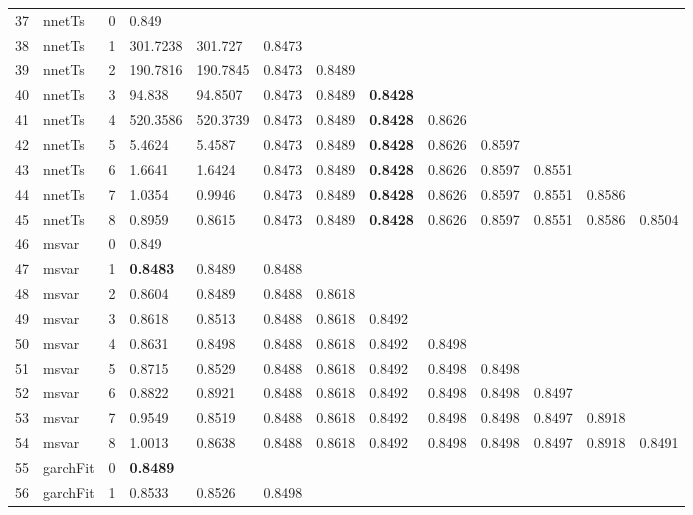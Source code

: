 \documentclass[10pt,a4paper]{article}
\begin{document}
\begin{table}[ht]
\begin{tabular}{rlrllllllllll}
   \hline
37 & nnetTs &     0 & 0.849 &  &  &  &  &  &  &  &  &  \\ 
  38 & nnetTs &     1 & 301.7238 & 301.727 & 0.8473 &  &  &  &  &  &  &  \\ 
  39 & nnetTs &     2 & 190.7816 & 190.7845 & 0.8473 & 0.8489 &  &  &  &  &  &  \\ 
  40 & nnetTs &     3 & 94.838 & 94.8507 & 0.8473 & 0.8489 & \textbf{0.8428} &  &  &  &  &  \\ 
  41 & nnetTs &     4 & 520.3586 & 520.3739 & 0.8473 & 0.8489 & \textbf{0.8428} & 0.8626 &  &  &  &  \\ 
  42 & nnetTs &     5 & 5.4624 & 5.4587 & 0.8473 & 0.8489 & \textbf{0.8428} & 0.8626 & 0.8597 &  &  &  \\ 
  43 & nnetTs &     6 & 1.6641 & 1.6424 & 0.8473 & 0.8489 & \textbf{0.8428} & 0.8626 & 0.8597 & 0.8551 &  &  \\ 
  44 & nnetTs &     7 & 1.0354 & 0.9946 & 0.8473 & 0.8489 & \textbf{0.8428} & 0.8626 & 0.8597 & 0.8551 & 0.8586 &  \\ 
  45 & nnetTs &     8 & 0.8959 & 0.8615 & 0.8473 & 0.8489 & \textbf{0.8428} & 0.8626 & 0.8597 & 0.8551 & 0.8586 & 0.8504 \\ 
   \hline
46 & msvar &     0 & 0.849 &  &  &  &  &  &  &  &  &  \\ 
  47 & msvar &     1 & \textbf{0.8483} & 0.8489 & 0.8488 &  &  &  &  &  &  &  \\ 
  48 & msvar &     2 & 0.8604 & 0.8489 & 0.8488 & 0.8618 &  &  &  &  &  &  \\ 
  49 & msvar &     3 & 0.8618 & 0.8513 & 0.8488 & 0.8618 & 0.8492 &  &  &  &  &  \\ 
  50 & msvar &     4 & 0.8631 & 0.8498 & 0.8488 & 0.8618 & 0.8492 & 0.8498 &  &  &  &  \\ 
  51 & msvar &     5 & 0.8715 & 0.8529 & 0.8488 & 0.8618 & 0.8492 & 0.8498 & 0.8498 &  &  &  \\ 
  52 & msvar &     6 & 0.8822 & 0.8921 & 0.8488 & 0.8618 & 0.8492 & 0.8498 & 0.8498 & 0.8497 &  &  \\ 
  53 & msvar &     7 & 0.9549 & 0.8519 & 0.8488 & 0.8618 & 0.8492 & 0.8498 & 0.8498 & 0.8497 & 0.8918 &  \\ 
  54 & msvar &     8 & 1.0013 & 0.8638 & 0.8488 & 0.8618 & 0.8492 & 0.8498 & 0.8498 & 0.8497 & 0.8918 & 0.8491 \\ 
   \hline
55 & garchFit &     0 & \textbf{0.8489} &  &  &  &  &  &  &  &  &  \\ 
  56 & garchFit &     1 & 0.8533 & 0.8526 & 0.8498 &  &  &  &  &  &  &  \\ 

\end{tabular}
\end{table}
\end{document}
